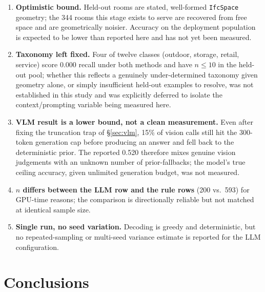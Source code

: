 \documentclass[11pt,a4paper]{article}
\begin{document}
\begin{enumerate}
\item \textbf{Optimistic bound.} Held-out rooms are stated, well-formed
\texttt{IfcSpace} geometry; the 344 rooms this stage exists to serve are
recovered from free space and are geometrically noisier. Accuracy on the
deployment population is expected to be lower than reported here and has not
yet been measured.
\item \textbf{Taxonomy left fixed.} Four of twelve classes (outdoor, storage,
retail, service) score 0.000 recall under both methods and have $n \leq 10$ in
the held-out pool; whether this reflects a genuinely under-determined
taxonomy given geometry alone, or simply insufficient held-out examples to
resolve, was not established in this study and was explicitly deferred to
isolate the context/prompting variable being measured here.
\item \textbf{VLM result is a lower bound, not a clean measurement.} Even
after fixing the truncation trap of \S\ref{sec:vlm}, 15\% of vision calls
still hit the 300-token generation cap before producing an answer and fell
back to the deterministic prior. The reported 0.520 therefore mixes genuine
vision judgements with an unknown number of prior-fallbacks; the model's true
ceiling accuracy, given unlimited generation budget, was not measured.
\item \textbf{$n$ differs between the LLM row and the rule rows} (200 vs.\
593) for GPU-time reasons; the comparison is directionally reliable but not
matched at identical sample size.
\item \textbf{Single run, no seed variation.} Decoding is greedy and
deterministic, but no repeated-sampling or multi-seed variance estimate is
reported for the LLM configuration.
\end{enumerate}

\section{Conclusions}
\end{document}
